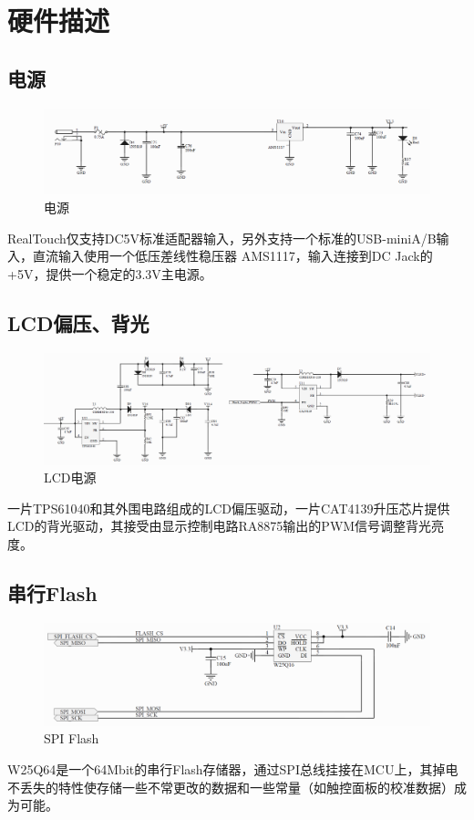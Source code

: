 \documentclass[titlepage]{article}
\begin{document}
 \section{硬件描述}
 \subsection{电源}
 \begin{figure}[h]
 \centering
 \includegraphics[width=15cm]{power.png}
 \caption{电源}
 \end{figure}
RealTouch仅支持DC5V标准适配器输入，另外支持一个标准的USB-miniA/B输入，直流输入使用一个低压差线性稳压器
AMS1117，输入连接到DC Jack的+5V，提供一个稳定的3.3V主电源。
 \subsection{LCD偏压、背光}
  \begin{figure}[h]
  \centering
  \includegraphics[width=15cm]{lcd_power.png}
  \caption{LCD电源}
 \end{figure}
 一片TPS61040和其外围电路组成的LCD偏压驱动，一片CAT4139升压芯片提供LCD的背光驱动，其接受由显示控制电路RA8875输出的PWM信号调整背光亮度。
 \newpage
 \subsection{串行Flash}
  \begin{figure}[h]
  \centering
  \includegraphics[width=15cm]{spiflash.png}
  \caption{SPI Flash}
 \end{figure}
 W25Q64是一个64Mbit的串行Flash存储器，通过SPI总线挂接在MCU上，其掉电不丢失的特性使存储一些不常更改的数据和一些常量（如触控面板的校准数据）成为可能。
 \newpage
\end{document}
